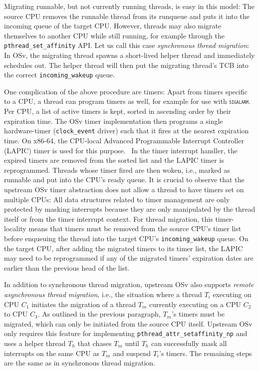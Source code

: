 \documentclass[12pt,a4paper]{book}
\begin{document}
Migrating runnable, but not currently running threads, is easy in this model:
The source CPU removes the runnable thread from its runqueue and puts it into the incoming queue of the target CPU.
However, threads may also migrate themselves to another CPU while still running, for example through the \lstinline[style=figurecpp]{pthread_set_affinity} API.
Let us call this case \emph{synchronous thread migration}:
In OSv, the migrating thread spawns a short-lived helper thread and immediately schedules out.
The helper thread will then put the migrating thread's TCB into the correct \lstinline[style=figurecpp]{incoming_wakeup} queue.~\cite{osvGit}

One complication of the above procedure are timers:
Apart from timers specific to a CPU, a thread can program timers as well, for example for use with \textsc{\texttt{sigalarm}}.
Per CPU, a list of active timers is kept, sorted in ascending order by their expiration time.
The OSv timer implementation then programs a single hardware-timer (\lstinline[style=figurecpp]{clock_event} driver) such that it fires at the nearest expiration time.
On x86-64, the CPU-local Advanced Programmable Interrupt Controller (LAPIC) timer is used for this purpose.~\cite{intelSDMLAPICTimer}
In the timer interrupt handler, the expired timers are removed from the sorted list and the LAPIC timer is reprogrammed.
Threads whose timer fired are then woken, i.e., marked as runnable and put into the CPU's ready queue.
It is crucial to observe that the upstream OSv timer abstraction does not allow a thread to have timers set on multiple CPUs:
All data structures related to timer management are only protected by masking interrupts because they are only manipulated by the thread itself or from the timer interrupt context.
For thread migration, this timer-locality means that timers must be removed from the source CPU's timer list before enqueuing the thread into the target CPU's \lstinline[style=figurecpp]{incoming_wakeup} queue.
On the target CPU, after adding the migrated timers to its timer list, the LAPIC may need to be reprogrammed if any of the migrated timers' expiration dates are earlier than the previous head of the list.~\cite{osvGit}

In addition to synchronous thread migration, upstream OSv also supports \emph{remote asynchronous thread migration}, i.e., the situation where a thread $T_i$ executing on CPU $C_1$ initiates the migration of a thread $T_m$ currently executing on a CPU $C_2$ to CPU $C_3$.
As outlined in the previous paragraph, $T_m$'s timers must be migrated, which can only be initiated from the source CPU itself.
Upstream OSv only requires this feature for implementing \lstinline[style=figurecpp]{pthread_attr_setaffinity_np} and uses a helper thread $T_h$ that chases $T_m$ until $T_h$ can successfully mask all interrupts on the same CPU as $T_m$ and suspend $T_i$'s timers.
The remaining steps are the same as in synchronous thread migration.~\cite{osvGit}
\end{document}
